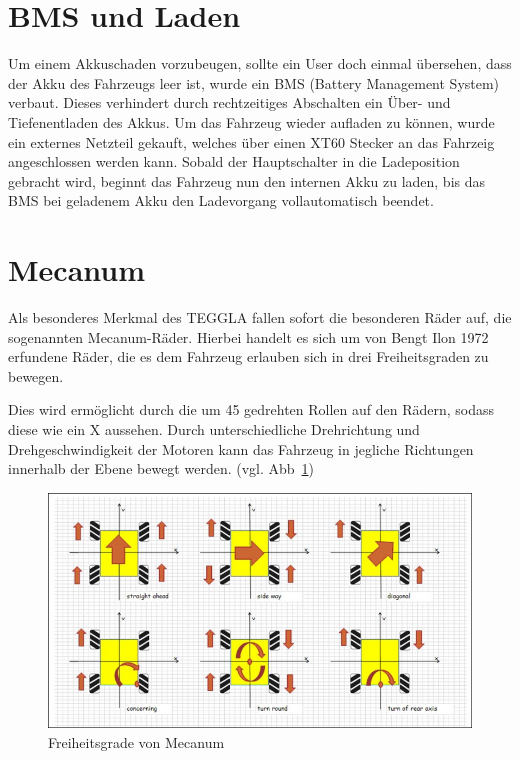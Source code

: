 \section{BMS und Laden}
Um einem Akkuschaden vorzubeugen, sollte ein User doch einmal übersehen, dass der Akku des Fahrzeugs leer ist, wurde ein BMS (Battery Management System) verbaut.
Dieses verhindert durch rechtzeitiges Abschalten ein Über- und Tiefenentladen des Akkus. 
Um das Fahrzeug wieder aufladen zu können, wurde ein externes Netzteil gekauft, welches über einen XT60 Stecker an das Fahrzeig angeschlossen werden kann.
Sobald der Hauptschalter in die Ladeposition gebracht wird, beginnt das Fahrzeug nun den internen Akku zu laden, bis das BMS bei geladenem Akku den Ladevorgang vollautomatisch beendet.

\section{Mecanum}
Als besonderes Merkmal des TEGGLA fallen sofort die besonderen Räder auf, die sogenannten Mecanum-Räder. 
Hierbei handelt es sich um von Bengt Ilon 1972 erfundene Räder, die es dem Fahrzeug erlauben sich in drei Freiheitsgraden zu bewegen.

Dies wird ermöglicht durch die um 45\degree{} gedrehten Rollen auf den Rädern, sodass diese wie ein X aussehen.
Durch unterschiedliche Drehrichtung und Drehgeschwindigkeit der Motoren kann das Fahrzeug in jegliche Richtungen innerhalb der Ebene bewegt werden. (vgl. Abb~\ref{bild:mecanum})

\begin{figure}[!ht]
	\centering
	\includegraphics[width=\textwidth]{bilder/mecanum.jpg}
	\caption{Freiheitsgrade von Mecanum \cite{link:mecanum}}
	\label{bild:mecanum}
\end{figure}

